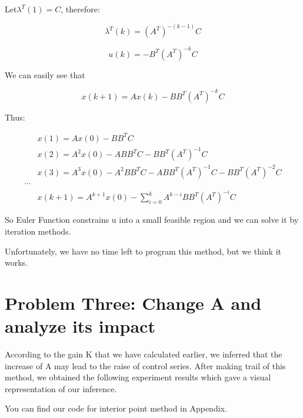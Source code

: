 \documentclass{mcmthesis}
\begin{document}
Let$\lambda^T(1)=C$, therefore:

 $$\lambda^T(k)=(A^T)^{-(k-1)}C$$

$$u(k)=-B^T(A^T)^{-k}C$$

We can easily see that

$$x(k+1)=Ax(k)-BB^T(A^T)^{-k}C$$

Thus:

\begin{align}
&x(1)=A x(0)-B B^{T} C \\
&x(2)=A^{2} x(0)-A B B^{T} C-B B^{T}\left(A^{T}\right)^{-1} C \\
&x(3)=A^{3} x(0)-A^{2} B B^{T} C-A B B^{T}\left(A^{T}\right)^{-1} C-B B^{T}\left(A^{T}\right)^{-2} C \\
\cdots \\
& x(k+1)=A^{k+1} x(0)-\sum_{i=0}^{k} A^{k-i} B B^{T}\left(A^{T}\right)^{-i} C
\end{align}

So Euler Function constrains u into a small  feasible region and we can solve it by iteration methods.

Unfortunately, we have no time left to program this method, but we think it works.


\section{Problem Three: Change A and analyze its impact}
According to the gain K that we have calculated earlier, we inferred that the increase of A may lead to the raise of control series. After making trail of this method, we obtained the following experiment results which gave a visual representation of our inference.\cite{MatthewGSmith:2005:GPEM}\cite{conf/smc/NetoFR13}

You can find our code for interior point method in Appendix.
\end{document}
